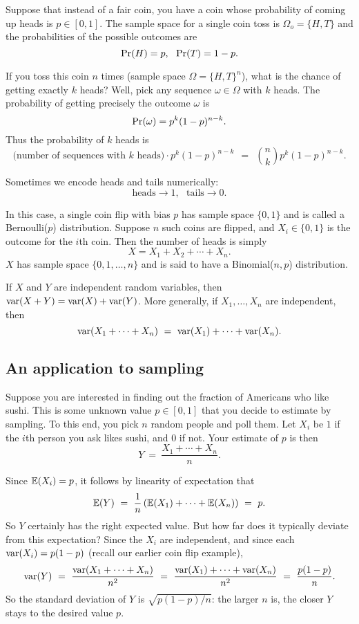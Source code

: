 Suppose that instead of a fair coin, you have a coin whose probability of coming up heads is $p \in [0,1]$. The sample space for a single coin toss is $\Omega_o = \{H,T\}$ and the probabilities of the possible outcomes are
$$ \mbox{\rm Pr}(H) = p, \ \ \mbox{\rm Pr}(T) = 1-p.$$

If you toss this coin $n$ times (sample space $\Omega = \{H,T\}^n$), what is the chance of getting exactly $k$ heads? Well, pick any sequence $\omega \in \Omega$ with $k$ heads. The probability of getting precisely the outcome $\omega$ is
$$ \mbox{\rm Pr}(\omega) = p^k (1-p)^{n-k} .$$
Thus the probability of $k$ heads is
$$ \mbox{(number of sequences with $k$ heads)} \cdot p^k (1-p)^{n-k} 
\ \ = \ \ 
{n \choose k} p^k (1-p)^{n-k} .$$

Sometimes we encode heads and tails numerically:
$$ \mbox{heads} \rightarrow 1, \ \ \ \mbox{tails} \rightarrow 0 .$$

In this case, a single coin flip with bias $p$ has sample space $\{0,1\}$ and is called a Bernoulli($p$) distribution. Suppose $n$ such coins are flipped, and $X_i \in \{0,1\}$ is the outcome for the $i$th coin. Then the number of heads is simply 
$$ X = X_1 + X_2 + \cdots + X_n. $$
$X$ has sample space $\{0,1,\ldots,n\}$ and is said to have a Binomial($n,p$) distribution.

If $X$ and $Y$ are independent random variables, then $\mbox{\rm var}(X+Y) = \mbox{\rm var}(X) + \mbox{\rm var}(Y)$.
More generally, if $X_1, \ldots, X_n$ are independent, then
$$ \var(X_1 + \cdots + X_n)
\ = \ 
\var(X_1) + \cdots + \var(X_n).
$$


\subsection{An application to sampling}

Suppose you are interested in finding out the fraction of Americans who like sushi. 
This is some unknown value $p \in [0,1]$ that you decide to estimate by sampling.
To this end, you pick $n$ random people and poll them. Let $X_i$ be $1$ if the $i$th
person you ask likes sushi, and $0$ if not. Your estimate of $p$ is then
$$ Y \ = \ \frac{X_1 + \cdots + X_n}{n}.$$

Since $\mathbb{E}(X_i) = p$, it follows by linearity of expectation that
$$
\E(Y)
\ = \ 
\frac{1}{n} \left( \E(X_1) + \cdots + \E(X_n) \right)
\ = \ 
p.
$$
So $Y$ certainly has the right expected value. But how far does it typically
deviate from this expectation? Since the $X_i$ are independent, and since
each $\mbox{\rm var}(X_i) = p(1-p)$ (recall our earlier coin flip example), 
$$ 
\var(Y) 
\ = \ 
\frac{\var(X_1 + \cdots + X_n)}{n^2}
\ = \ 
\frac{\var(X_1) + \cdots + \var(X_n)}{n^2}  
\ = \ 
\frac{p(1-p)}{n}.
$$
So the standard deviation of $Y$ is $\sqrt{p(1-p)/n}$: the larger $n$ is,
the closer $Y$ stays to the desired value $p$.

